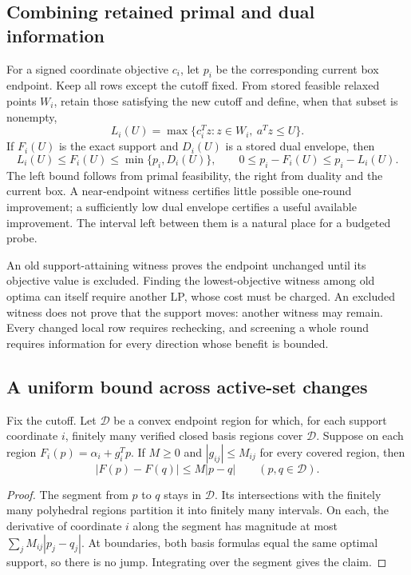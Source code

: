 \subsection{Combining retained primal and dual information}

For a signed coordinate objective $c_i$, let $p_i$ be the corresponding
current box endpoint. Keep all rows except the cutoff fixed. From stored
feasible relaxed points $W_i$, retain those satisfying the new cutoff and
define, when that subset is nonempty,
\[
 L_i(U)=\max\{c_i^Tz:z\in W_i,\ a^Tz\le U\}.
\]
If $F_i(U)$ is the exact support and $D_i(U)$ is a stored dual envelope,
then
\begin{equation}\label{eq:bracket}
 L_i(U)\le F_i(U)\le\min\{p_i,D_i(U)\},\qquad
 0\le p_i-F_i(U)\le p_i-L_i(U).
\end{equation}
The left bound follows from primal feasibility, the right from duality
and the current box. A near-endpoint witness certifies little possible
one-round improvement; a sufficiently low dual envelope certifies a
useful available improvement. The interval left between them is a natural
place for a budgeted probe.

An old support-attaining witness proves the endpoint unchanged until its
objective value is excluded. Finding the lowest-objective witness among
old optima can itself require another LP, whose cost must be charged.
An excluded witness does not prove that the support moves: another
witness may remain. Every changed local row requires rechecking, and
screening a whole round requires information for every direction whose
benefit is bounded.

\subsection{A uniform bound across active-set changes}

\begin{proposition}\label{prop:cells}
Fix the cutoff. Let $\mathcal D$ be a convex endpoint region for which,
for each support coordinate $i$, finitely many verified closed basis
regions cover $\mathcal D$. Suppose on each region
$F_i(p)=\alpha_i+g_i^Tp$. If $M\ge0$ and $|g_{ij}|\le M_{ij}$
for every covered region, then
\[
 |F(p)-F(q)|\le M|p-q|\qquad(p,q\in\mathcal D).
\]
\end{proposition}
\begin{proof}
The segment from $p$ to $q$ stays in $\mathcal D$. Its intersections
with the finitely many polyhedral regions partition it into finitely
many intervals. On each, the derivative of coordinate $i$ along the
segment has magnitude at most $\sum_jM_{ij}|p_j-q_j|$. At boundaries,
both basis formulas equal the same optimal support, so there is no jump.
Integrating over the segment gives the claim.
\end{proof}

